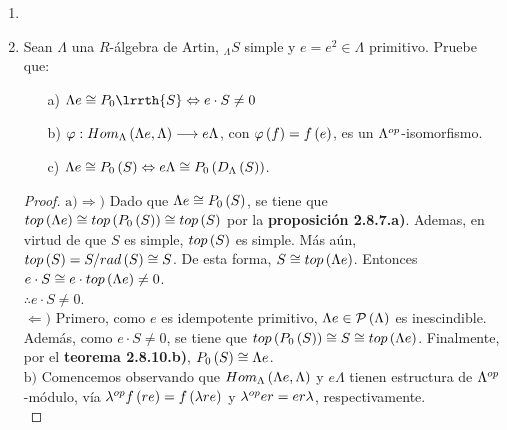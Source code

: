 \documentclass{article}
\begin{document}
\begin{enumerate}[label=\textbf{Ej \arabic*.}]
		\item 
		
		\item Sean $\Lambda$ una $R$-álgebra de Artin, $_{\Lambda}S$ simple y $e=e^{2}\in\Lambda$ primitivo. Pruebe que:
		\begin{itemize}
			\item[a)] $\Lambda e \cong P_{0}\lrrth{S} \Leftrightarrow e \cdot S \neq 0$
			\item[b)] $\varphi : Hom_{\Lambda}\left(\Lambda e,\Lambda\right) \longrightarrow e \Lambda$, con $\varphi\left(f\right)=f\left(e\right)$, es un ${\Lambda}^{op}$-isomorfismo.
			\item[c)] $\Lambda e \cong P_{0}\left(S\right) \Leftrightarrow e\Lambda \cong P_{0}\left(D_{\Lambda}\left(S\right)\right)$.
		\end{itemize}
		\begin{proof}
			$\boxed{\text{a)}}\boxed{\Rightarrow )}$ Dado que $\Lambda e \cong P_{0}\left(S\right)$, se tiene que $top\left(\Lambda e\right) \cong top\left(P_{0}\left(S\right)\right) \cong top\left(S\right)$ por la \textbf{proposición 2.8.7.a)}. Ademas, en virtud de que $S$ es simple, $top\left(S\right)$ es simple. Más aún, $top\left(S\right) = S/rad\left(S\right) \cong S$. De esta forma, $S \cong top\left(\Lambda e\right)$. Entonces $e \cdot S \cong e \cdot top\left(\Lambda e\right) \neq 0$.\\
			$\therefore e \cdot S \neq 0$.\\
		
			$\boxed{\Leftarrow )}$ Primero, como $e$ es idempotente primitivo, $\Lambda e\in\mathcal{P}\left(\Lambda\right)$ es inescindible. Además, como $e \cdot S \neq 0$, se tiene que $top\left(P_{0}\left(S\right)\right) \cong S \cong top\left(\Lambda e\right)$. Finalmente, por el \textbf{teorema 2.8.10.b)}, $P_{0}\left(S\right)\cong\Lambda e$.\\
		
			$\boxed{\text{b)}}$ Comencemos observando que $Hom_{\Lambda}\left(\Lambda e,\Lambda\right)$ y $e\Lambda$ tienen estructura de ${\Lambda}^{op}$-módulo, vía ${\lambda}^{op}f\left(re\right)=f\left(\lambda re\right)$ y ${\lambda}^{op}er=er\lambda$, respectivamente.\\
		

\end{proof}
\end{enumerate}
\end{document}

